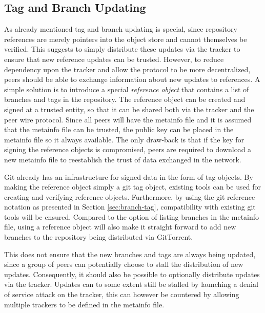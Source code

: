 \subsection{Tag and Branch Updating}
\label{sec:branch-updates}

As already mentioned tag and branch updating is special, since
repository references are merely pointers into the object store and
cannot themselves be verified. This suggests to simply distribute
these updates via the tracker to ensure that new reference updates can
be trusted. However, to reduce dependency upon the tracker and allow
the protocol to be more decentralized, peers should be able to
exchange information about new updates to references.  A simple
solution is to introduce a special \emph{reference object} that
contains a list of branches and tags in the repository. The reference
object can be created and signed at a trusted entity, so that it can
be shared both via the tracker and the peer wire protocol.  Since all
peers will have the metainfo file and it is assumed that the metainfo
file can be trusted, the public key can be placed in the metainfo file
so it always available. The only draw-back is that if the key for
signing the reference objects is compromised, peers are required to
download a new metainfo file to reestablish the trust of data
exchanged in the network.


Git already has an infrastructure for signed data in the form of tag
objects. By making the reference object simply a git tag object,
existing tools can be used for creating and verifying reference
objects. Furthermore, by using the git reference notation as presented
in Section \ref{sec:branch-tag}, compatibility with existing git tools
will be ensured. Compared to the option of listing branches in the
metainfo file, using a reference object will also make it straight
forward to add new branches to the repository being distributed via
GitTorrent.

This does not ensure that the new branches and tags are always being
updated, since a group of peers can potentially choose to stall the
distribution of new updates. Consequently, it should also be possible
to optionally distribute updates via the tracker. Updates can to some
extent still be stalled by launching a denial of service attack on the
tracker, this can however be countered by allowing multiple trackers
to be defined in the metainfo file.

